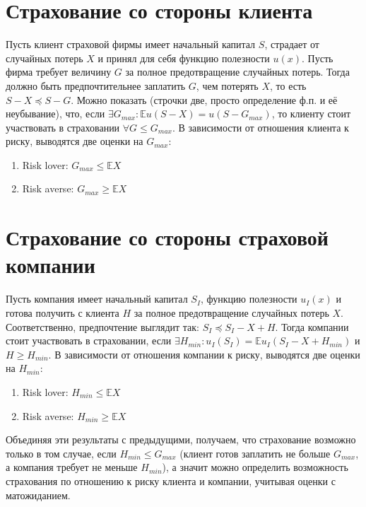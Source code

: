 \documentclass{article}
\theoremstyle{definition}
\begin{document}
\section{Страхование со стороны клиента}
Пусть клиент страховой фирмы имеет начальный капитал $S$, страдает от случайных потерь $X$ и принял для себя функцию полезности $u(x)$. Пусть фирма требует величину $G$ за полное предотвращение случайных потерь. Тогда должно быть предпочтительнее заплатить $G$, чем потерять $X$, то есть $S - X \preceq S - G$. Можно показать (строчки две, просто определение ф.п. и её неубывание), что, если $\exists G_{max}: \mathbb{E}u(S - X) = u(S - G_{max})$, то клиенту стоит участвовать в страховании $\forall G \le G_{max}$. В зависимости от отношения клиента к риску, выводятся две оценки на $G_{max}$:
\begin{enumerate}
    \item Risk lover: $G_{max} \le \mathbb{E}X$
    \item Risk averse: $G_{max} \ge \mathbb{E}X$
\end{enumerate}

\section{Страхование со стороны страховой компании}
Пусть компания имеет начальный капитал $S_I$, функцию полезности $u_I(x)$ и готова получить с клиента $H$ за полное предотвращение случайных потерь $X$. Соответственно, предпочтение выглядит так: $S_I \preceq S_I - X + H$. Тогда компании стоит участвовать в страховании, если $\exists H_{min}: u_I(S_I) = \mathbb{E}u_I(S_I - X + H_{min})$ и $H \ge H_{min}$. В зависимости от отношения компании к риску, выводятся две оценки на $H_{min}$:
\begin{enumerate}
    \item Risk lover: $H_{min} \le \mathbb{E}X$
    \item Risk averse: $H_{min} \ge \mathbb{E}X$
\end{enumerate}
Объединяя эти результаты с предыдущими, получаем, что страхование возможно только в том случае, если $H_{min} \le G_{max}$ (клиент готов заплатить не больше $G_{max}$, а компания требует не меньше $H_{min}$), а значит можно определить возможность страхования по отношению к риску клиента и компании, учитывая оценки с матожиданием.
\end{document}
